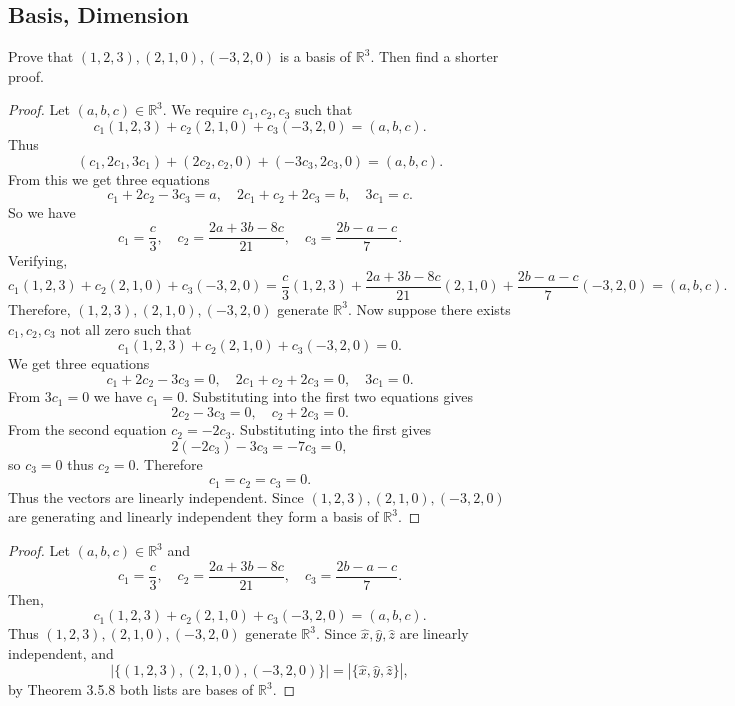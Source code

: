 \subsection{Basis, Dimension}


\begin{tcolorbox}[title=Problem 1, breakable]
    Prove that $(1, 2, 3), (2, 1, 0), (-3, 2, 0)$
    is a basis of $\mathbb{R}^3$. Then find a shorter proof.
\end{tcolorbox}

\begin{proof}
    Let $(a, b, c) \in \mathbb{R}^3$.
    We require $c_1, c_2, c_3$ such that 
    \[c_1 (1, 2, 3) + c_2 (2, 1, 0) + c_3 (-3, 2, 0) = (a, b, c).\]
    Thus 
    \[(c_1, 2 c_1, 3 c_1) + (2 c_2, c_2, 0) + (-3 c_3, 2 c_3, 0) = (a, b, c).\]
    From this we get three equations 
    \[c_1 + 2 c_2 - 3 c_3 = a, \quad 2 c_1 + c_2 + 2 c_3 = b, \quad 3 c_1 = c.\]
    So we have 
    \[c_1 = \frac{c}{3}, \quad c_2 = \frac{2a + 3b - 8c}{21}, \quad c_3 = \frac{2b - a - c}{7}.\]
    Verifying,
    \[
    c_1 (1, 2, 3) + c_2 (2, 1, 0) + c_3 (-3, 2, 0)
    =
    \frac{c}{3} (1, 2, 3)
    + \frac{2a + 3b - 8c}{21} (2, 1, 0)
    + \frac{2b - a - c}{7} (-3, 2, 0)
    = (a, b, c).
    \]
    Therefore, $(1, 2, 3), (2, 1, 0), (-3, 2, 0)$ generate $\mathbb{R}^3$.
    Now suppose there exists $c_1, c_2, c_3$ not all zero such that 
    \[c_1 (1, 2, 3) + c_2 (2, 1, 0) + c_3 (-3, 2, 0) = 0.\]
    We get three equations
    \[
    c_1 + 2c_2 - 3c_3 = 0, \quad
    2c_1 + c_2 + 2c_3 = 0, \quad
    3c_1 = 0.
    \]
    From $3c_1 = 0$ we have $c_1 = 0$. Substituting into the first two equations gives
    \[
    2c_2 - 3c_3 = 0, \quad c_2 + 2c_3 = 0.
    \]
    From the second equation $c_2 = -2c_3$. Substituting into the first gives
    \[
    2(-2c_3) - 3c_3 = -7c_3 = 0,
    \]
    so $c_3 = 0$ thus $c_2 = 0$. Therefore
    \[
    c_1 = c_2 = c_3 = 0.
    \]
    Thus the vectors are linearly independent.
    Since $(1, 2, 3), (2, 1, 0), (-3, 2, 0)$ are generating and linearly independent
        they form a basis of $\mathbb{R}^3$.
\end{proof}

\begin{proof}
    Let $(a, b, c) \in \mathbb{R}^3$ and 
    \[c_1 = \frac{c}{3}, \quad c_2 = \frac{2a + 3b - 8c}{21}, \quad c_3 = \frac{2b - a - c}{7}.\]
    Then,
    \[
    c_1 (1, 2, 3) + c_2 (2, 1, 0) + c_3 (-3, 2, 0)
    = (a, b, c).
    \]
    Thus $(1, 2, 3), (2, 1, 0), (-3, 2, 0)$ generate $\mathbb{R}^3$.
    Since $\hat{x}, \hat{y}, \hat{z}$ are linearly independent, and
    \[
    |\{(1, 2, 3), (2, 1, 0), (-3, 2, 0)\}| = |\{\hat{x}, \hat{y}, \hat{z}\}|,
    \]
    by Theorem 3.5.8 both lists are bases of $\mathbb{R}^3$.
\end{proof}

